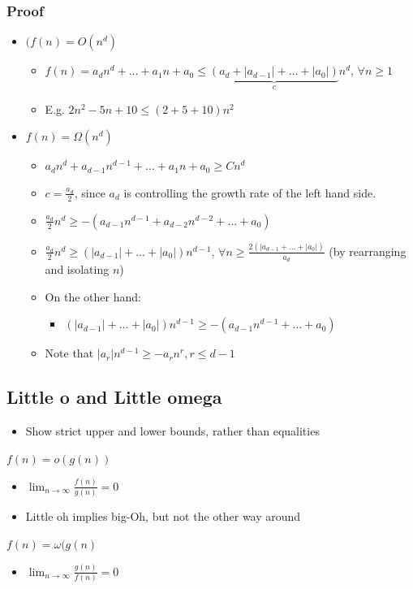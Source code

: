 \documentclass[11pt]{article}
\begin{document}
\subsubsection{Proof}
\label{sec:org290a61b}
\begin{itemize}
\item \((f(n)=O(n^d)\)
\begin{itemize}
\item \(f(n)=a_d n^d + \ldots + a_1n + a_0 \leq \underbrace{(a_d+|a_{d-1}|+\ldots+|a_0|)}_c n^d\), \(\forall n\geq 1\)
\item E.g. \(2n^2-5n+10 \leq (2+5+10)n^2\)
\end{itemize}
\item \(f(n)=\Omega(n^d)\)
\begin{itemize}
\item \(a_d n^d + a_{d-1}n^{d-1}+\ldots + a_1 n + a_0 \geq C n^d\)
\item \(c=\frac{a_d}{2}\), since \(a_d\) is controlling the growth rate of the left hand side.
\item \(\frac{a_d}{2}n^d \geq - (a_{d-1}n^{d-1}+a_{d-2}n^{d-2}+\ldots+a_0)\)
\item \(\frac{a_d}{2}n^d \geq (|a_{d-1}|+\ldots+|a_0|)n^{d-1}\), \(\forall n\geq \frac{2(|a_{d-1}+\ldots+|a_0|)}{a_d}\) (by rearranging and isolating \(n\))
\item On the other hand:
\begin{itemize}
\item \((|a_{d-1}|+\ldots+|a_0|)n^{d-1} \geq - (a_{d-1}n^{d-1}+\ldots+a_0)\)
\end{itemize}
\item Note that \(|a_r|n^{d-1} \geq -a_r n^r, r\leq d-1\)
\end{itemize}
\end{itemize}
\subsection{Little o and Little omega}
\label{sec:orgbe30835}
\begin{itemize}
\item Show strict upper and lower bounds, rather than equalities
\end{itemize}
\(f(n)=o(g(n))\)
\begin{itemize}
\item \(\lim_{n\to \infty}\frac{f(n)}{g(n)}=0\)
\item Little oh implies big-Oh, but not the other way around
\end{itemize}
\(f(n)=\omega (g(n)\)
\begin{itemize}
\item \(\lim_{n\to \infty} \frac{g(n)}{f(n)} = 0\)
\end{itemize}
\end{document}
